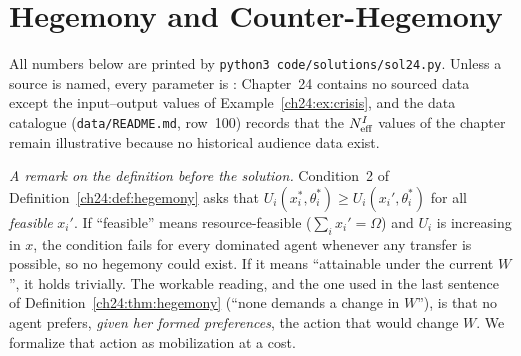\documentclass[../solutions_manual.tex]{subfiles}
\begin{document}
\ifSubfilesClassLoaded{\setcounter{chapter}{23}}{}%
\setcounter{chapter}{23}%
\chapter{Hegemony and Counter-Hegemony}\label{sol24}
\begingroup\sloppy

All numbers below are printed by \texttt{python3 code/solutions/sol24.py}. Unless a source is named, every parameter is \illustrative: Chapter~24 contains no sourced data except the input--output values of Example~\ref{ch24:ex:crisis}, and the data catalogue (\texttt{data/README.md}, row~100) records that the $N_{\text{eff}}^I$ values of the chapter remain illustrative because no historical audience data exist.


\emph{A remark on the definition before the solution.} Condition~2 of Definition~\ref{ch24:def:hegemony} asks that $U_i(x_i^*,\theta_i^*) \ge U_i(x_i',\theta_i^*)$ for all \emph{feasible} $x_i'$. If ``feasible'' means resource-feasible ($\sum_i x_i' = \Omega$) and $U_i$ is increasing in $x$, the condition fails for every dominated agent whenever any transfer is possible, so no hegemony could exist. If it means ``attainable under the current $W$'', it holds trivially. The workable reading, and the one used in the last sentence of Definition~\ref{ch24:thm:hegemony} (``none demands a change in $W$''), is that no agent prefers, \emph{given her formed preferences}, the action that would change $W$. We formalize that action as mobilization at a cost.
\end{document}

